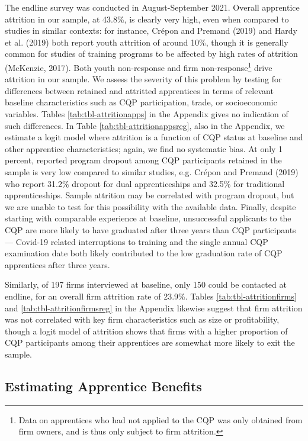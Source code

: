 \documentclass[
  11pt,
a4paper
]{report}
\begin{document}
The endline survey was conducted in August-September 2021. Overall apprentice attrition in our sample, at 43.8\%, is clearly very high, even when compared to studies in similar contexts: for instance, Crépon and Premand (2019) and Hardy et al. (2019) both report youth attrition of around 10\%, though it is generally common for studies of training programs to be affected by high rates of attrition (McKenzie, 2017). Both youth non-response and firm non-response\footnote{Data on apprentices who had not applied to the CQP was only obtained from firm owners, and is thus only subject to firm attrition.} drive attrition in our sample. We assess the severity of this problem by testing for differences between retained and attritted apprentices in terms of relevant baseline characteristics such as CQP participation, trade, or socioeconomic variables. Tables \ref{tab:tbl-attritionapps} in the Appendix gives no indication of such differences. In Table \ref{tab:tbl-attritionappsreg}, also in the Appendix, we estimate a logit model where attrition is a function of CQP status at baseline and other apprentice characteristics; again, we find no systematic bias. At only 1 percent, reported program dropout among CQP participants retained in the sample is very low compared to similar studies, e.g. Crépon and Premand (2019) who report 31.2\% dropout for dual apprenticeships and 32.5\% for traditional apprenticeships. Sample attrition may be correlated with program dropout, but we are unable to test for this possibility with the available data. Finally, despite starting with comparable experience at baseline, unsuccessful applicants to the CQP are more likely to have graduated after three years than CQP participants --- Covid-19 related interruptions to training and the single annual CQP examination date both likely contributed to the low graduation rate of CQP apprentices after three years.

Similarly, of 197 firms interviewed at baseline, only 150 could be contacted at endline, for an overall firm attrition rate of 23.9\%. Tables \ref{tab:tbl-attritionfirms} and \ref{tab:tbl-attritionfirmsreg} in the Appendix likewise suggest that firm attrition was not correlated with key firm characteristics such as size or profitability, though a logit model of attrition shows that firms with a higher proportion of CQP participants among their apprentices are somewhat more likely to exit the sample.

\hypertarget{appmethod}{%
\subsection{Estimating Apprentice Benefits}\label{appmethod}}
\end{document}
